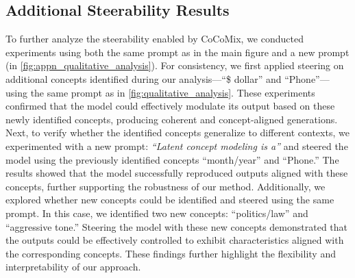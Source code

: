 \documentclass[]{fairmeta}
\newcommand{\sname}{CoCoMix\xspace}
\begin{document}
\subsection{Additional Steerability Results}
\label{sec_appn:more_steerability}





To further analyze the steerability enabled by \sname, we conducted experiments using both the same prompt as in the main figure and a new prompt (in \autoref{fig:appn_qualitative_analysis}). For consistency, we first applied steering on additional concepts identified during our analysis—``\$ dollar'' and ``Phone''—using the same prompt as in \autoref{fig:qualitative_analysis}. These experiments confirmed that the model could effectively modulate its output based on these newly identified concepts, producing coherent and concept-aligned generations. Next, to verify whether the identified concepts generalize to different contexts, we experimented with a new prompt: \textit{``Latent concept modeling is a''} and steered the model using the previously identified concepts ``month/year'' and ``Phone.'' The results showed that the model successfully reproduced outputs aligned with these concepts, further supporting the robustness of our method. Additionally, we explored whether new concepts could be identified and steered using the same prompt. In this case, we identified two new concepts: ``politics/law'' and ``aggressive tone.'' Steering the model with these new concepts demonstrated that the outputs could be effectively controlled to exhibit characteristics aligned with the corresponding concepts. These findings further highlight the flexibility and interpretability of our approach.
\end{document}
